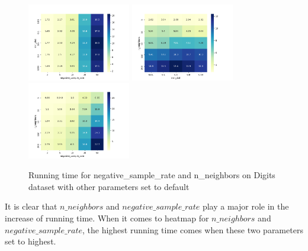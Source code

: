 \begin{enumerate}[1)]
\begin{figure}[H]
\centering  %
{
\label{Fig.sub.1}
\includegraphics[width=4.5cm,height=4cm\textwidth]{images/umap/comparison/Digit_elapsed_time_min_dist_negative_sample_rate_heatmap.png}}
{
\label{Fig.sub.2}
\includegraphics[width=4.5cm,height=4cm\textwidth]{images/umap/comparison/Digit_elapsed_time_n_neighbors_min_dist_heatmap.png}}
{
\label{Fig.sub.3}
\includegraphics[width=4.5cm,height=4cm\textwidth]{images/umap/comparison/Digit_elapsed_time_n_neighbors_negative_sample_rate_heatmap.png}}
\centering
\caption{Running time for negative\_sample\_rate and n\_neighbors on Digits dataset with other parameters set to default}
\end{figure}


It is clear that $n\_neighbors$ and $negative\_sample\_rate$  play a major role in the increase of running time. When it comes to heatmap for $n\_neighbors$ and $negative\_sample\_rate$, the highest running time comes when these two parameters set to highest.

\end{enumerate}\\

